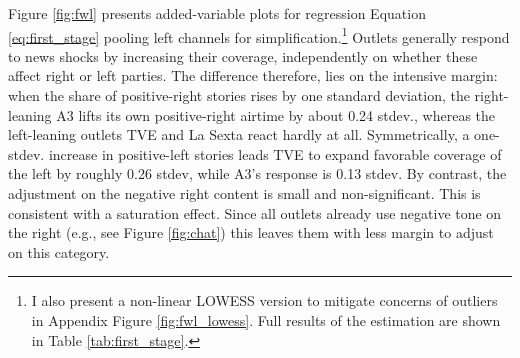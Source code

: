 \documentclass[12pt]{article}
\begin{document}
Figure \ref{fig:fwl} presents added-variable plots for regression Equation  \eqref{eq:first_stage}  pooling left channels for simplification.\footnote{I also present a non-linear LOWESS version to mitigate concerns of outliers in Appendix Figure \ref{fig:fwl_lowess}. Full results of the estimation are shown in Table \ref{tab:first_stage}.} Outlets generally respond to news shocks by increasing their coverage, independently on whether these affect  right or left parties. The difference therefore, lies on the intensive margin: when the share of  positive-right stories rises by one standard deviation, the right-leaning A3 lifts its own positive-right airtime by about 0.24 stdev., whereas the left-leaning outlets TVE and La Sexta react hardly at all.  Symmetrically, a one-stdev. increase in positive-left stories leads TVE to expand favorable coverage of the left by roughly 0.26 stdev, while A3’s response is 0.13 stdev.  By contrast, the adjustment on the negative right content is small and non-significant. This is consistent with a saturation effect. Since all outlets already use negative tone on the right  (e.g., see Figure \ref{fig:chat}) this leaves them with less margin to adjust on this category. 





 

	
	
\end{document}
